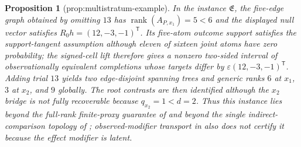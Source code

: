 \documentclass{article}
\newtheorem{proposition}{Proposition}
\begin{document}
\begin{proposition}[prop:multistratum-example]\label{prop:multistratum-example}
In the instance \(\mathfrak E\), the five-edge graph obtained by omitting \(13\) has \(\operatorname{rank}(A_{P,x_1})=5<6\) and the displayed null vector satisfies \(R_0h=(12,-3,-1)^{\mathsf T}\). Its five-atom outcome support satisfies the support-tangent assumption although eleven of sixteen joint atoms have zero probability; the signed-cell lift therefore gives a nonzero two-sided interval of observationally equivalent completions whose targets differ by \(\varepsilon(12,-3,-1)^{\mathsf T}\). Adding trial \(13\) yields two edge-disjoint spanning trees and generic ranks \(6\) at \(x_1\), \(3\) at \(x_2\), and \(9\) globally. The root contrasts are then identified although the \(x_2\) bridge is not fully recoverable because \(q_{x_2}=1<d=2\). Thus this instance lies beyond the full-rank finite-proxy guarantee of \cite{MiaoGengTchetgen2018} and beyond the single indirect-comparison topology of \cite{SuRytgaardRavnEriksson2026}; observed-modifier transport in \cite{DahabrehRobertsonPetitoHernanSteingrimsson2023} also does not certify it because the effect modifier is latent.
\end{proposition}
\end{document}
